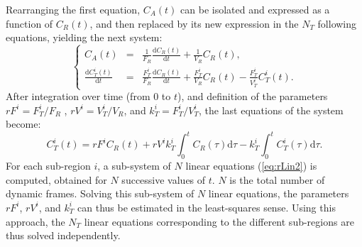 Rearranging the first equation, $C_A\left(t\right)$ can be isolated and expressed as a function of $C_R\left(t\right)$, and then replaced by its new expression in the $N_T$ following equations, yielding the next system:
\begin{equation}
\left\{ \begin{array}{rcl}
C_A \left(t\right) &=& \frac{1}{F_R} \frac{\mathrm dC_R \left(t\right)}{\mathrm dt} + \frac{1}{V_R} C_R \left(t\right),\\
\frac{\mathrm dC_T^i\left(t\right)}{\mathrm dt} &=& \frac{F_T^i}{F_R} \frac{\mathrm dC_R \left(t\right)}{\mathrm dt} + \frac{F_T^i}{V_R} C_R \left(t\right) - \frac{F_T^i}{V_T^i} C_T^i \left(t\right).
\end{array}\right.
\end{equation}
After integration over time (from 0 to $t$), and definition of the parameters $rF^i = F_T^i/F_R$ , $rV^i = V_T^i/V_R$, and $k_T^i = F_T^i/V_T^i$, the last equations of the system become:
\begin{equation}
C_T^i\left(t\right)=rF^iC_R \left(t\right) + rV^ik_T^i \int_0^t C_R \left(\tau\right)\mathrm d\tau - k_T^i\int_0^t C_T^i \left(\tau\right)\mathrm d\tau.
\label{eq:rLin2}
\end{equation} 
For each sub-region $i$, a sub-system of $N$ linear equations (\ref{eq:rLin2}) is computed, obtained for $N$ successive values of $t$. $N$ is the total number of dynamic frames. Solving this sub-system of $N$ linear equations, the parameters $rF^i$, $rV^i$, and $k_T^i$ can thus be estimated in the least-squares sense. Using this approach, the $N_T$ linear equations corresponding to the different sub-regions are thus solved independently. 

